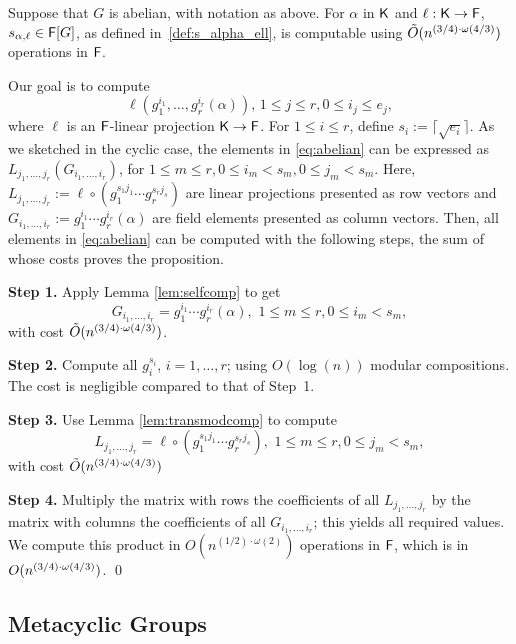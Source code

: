 \begin{proposition}\label{prop:abelian}
  Suppose that $G$ is abelian, with notation as above. For $\alpha$ in
  ${\mathsf{K}}$ and $\ell:{\mathsf{K}}\to{\mathsf{F}}$, $s_{\alpha,\ell} \in {\mathsf{F}}[G]$, as defined
  in~\eqref{def:s_alpha_ell}, is computable using $\tilde{O}(n^{(3/4)\cdot \omega(4/3)})$
  operations in ${\mathsf{F}}$.
\end{proposition}
Our goal is to compute
\begin{equation}\label{eq:abelian}
  \ell (g_1^{i_1},  \ldots, g_r^{i_r}(\alpha)), \, 1 \leq j \leq r, 0 \leq i_j \leq e_j,
\end{equation}
where $\ell$ is an ${\mathsf{F}}$-linear projection ${\mathsf{K}}\to {\mathsf{F}}$.  For $ 1\leq i
\leq r$, define $s_i:=\lceil\sqrt{e_i} \rceil$. As we sketched in the
cyclic case, the elements in \eqref{eq:abelian} can be expressed as
$L_{j_1,\dots, j_r} (G_{i_1,\dots,i_r})$, 
for $1\leq m \leq r, 0\leq i_m < s_m, 0 \leq j_m < s_m$.
Here, $L_{j_1,\dots,j_r} :=\ell \circ (g_1^{s_1j_1} \cdots
g_r^{s_rj_s})$ are linear projections presented as row vectors and
$G_{i_1,\dots,i_r}:=g_1^{i_1} \cdots g_r^{i_r}(\alpha)$ are field
elements presented as column vectors. Then, all elements in
\eqref{eq:abelian} can be computed with the following steps, the sum of whose 
costs proves the proposition.

\smallskip\noindent \textbf{Step 1.} Apply Lemma \ref{lem:selfcomp} to get 
$$G_{i_1,\dots,i_r}=g_1^{i_1} \cdots g_r^{i_r}(\alpha), \,\, 1\leq m \leq r, 0\leq i_m < s_m,$$
with cost $\tilde{O}(n^{(3/4)\cdot \omega(4/3)})$.

\smallskip\noindent\textbf{Step 2.} Compute all $g_i^{s_i}$, $i=1,\dots,r$;
using $O(\log(n))$ modular compositions. The cost is negligible
compared to that of Step~1.

\smallskip\noindent\textbf{Step 3.} Use Lemma \ref{lem:transmodcomp} to
compute
\smallskipback
$$L_{j_1,\dots,j_r} = \ell \circ (g_1^{s_1j_1} \cdots
g_r^{s_rj_s}), \,\, 1\leq m \leq r, 0 \leq j_m < s_m,$$
\smallskipback
with cost $\tilde{O}(n^{(3/4)\cdot \omega(4/3)})$

\smallskip\noindent\textbf{Step 4.} Multiply the matrix with rows the
coefficients of all $L_{j_1,\dots,j_r}$ by the matrix with columns the
coefficients of all $G_{i_1,\dots,i_r}$; this yields all required
values. We compute this product in $O(n^{(1/2)\cdot\omega(2)})$
operations in ${\mathsf{F}}$, which is in $O(n^{(3/4)\cdot \omega(4/3)})$. \qed



\subsection{Metacyclic Groups}

